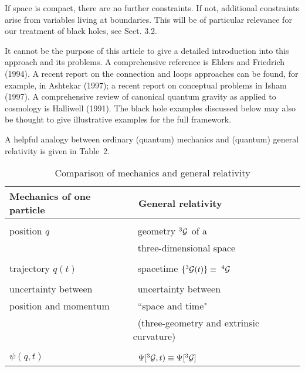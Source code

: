 If space is compact, there are no further
constraints. If not, additional constraints arise from variables
living at boundaries. This will be of particular relevance for
our treatment of black holes, see Sect. 3.2.

It cannot be the purpose of this article to give a detailed introduction
into this approach and its problems. A comprehensive reference is
Ehlers and Friedrich (1994). A recent report on the connection
and loops approaches can be found, for example, in Ashtekar (1997);
a recent report on conceptual problems in Isham (1997). 
A comprehensive review of canonical quantum gravity as applied to
cosmology is Halliwell (1991). The black hole examples discussed
below may also be thought to give illustrative examples
for the full framework.
 
A helpful analogy between ordinary (quantum) mechanics and
(quantum) general relativity is given in Table~2.

\begin{table}[htb]
\caption[ ]{Comparison of mechanics and general relativity}
\begin{flushleft}
\renewcommand{\arraystretch}{1.2}  
\begin{tabular}{l|l}
{Mechanics of one particle} &\ {General relativity} \\ \hline
{} & {} \\
position $q$ &\  geometry $^3{\cal G}$ of a  \\
{}  & \ three-dimensional space\\
{} & {} \\
trajectory $q(t)$ &\ spacetime $\{^3{\cal G}(t)\}\equiv\ ^4{\cal G}$ \\
{} & {} \\
uncertainty between &\ uncertainty between\\
position and momentum &\ ``space and time"\\
{} & \ (three-geometry and extrinsic curvature)\\
{} & {} \\
$\psi(q,t)$ &\ $\Psi[^3{\cal G},t)\equiv \Psi[^3{\cal G}]$ \\
\end{tabular}
\renewcommand{\arraystretch}{1}
\end{flushleft}\end{table}

